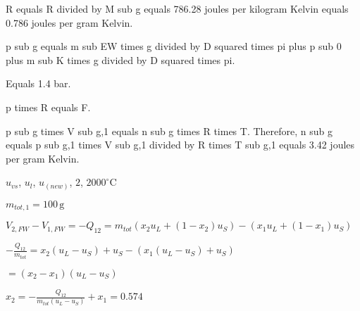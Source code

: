 R equals R divided by M sub g equals 786.28 joules per kilogram Kelvin equals 0.786 joules per gram Kelvin.  

p sub g equals m sub EW times g divided by D squared times pi plus p sub 0 plus m sub K times g divided by D squared times pi.  

Equals 1.4 bar.  

p times R equals F.  

p sub g times V sub g,1 equals n sub g times R times T. Therefore, n sub g equals p sub g,1 times V sub g,1 divided by R times T sub g,1 equals 3.42 joules per gram Kelvin.

\( u_{vs} \), \( u_{l} \), \( u_{(new)} \), \( 2 \), \( 2000^\circ \text{C} \)  

\( m_{tot,1} = 100 \, \text{g} \)  

\( V_{2,FW} - V_{1,FW} = -Q_{12} = m_{tot} \left( x_2 u_L + (1 - x_2) u_S \right) - \left( x_1 u_L + (1 - x_1) u_S \right) \)  

\(- \frac{Q_{12}}{m_{tot}} = x_2 (u_L - u_S) + u_S - \left( x_1 (u_L - u_S) + u_S \right)\)  

\( = (x_2 - x_1) (u_L - u_S) \)  

\( x_2 = - \frac{Q_{12}}{m_{tot} (u_L - u_S)} + x_1 = 0.574 \)